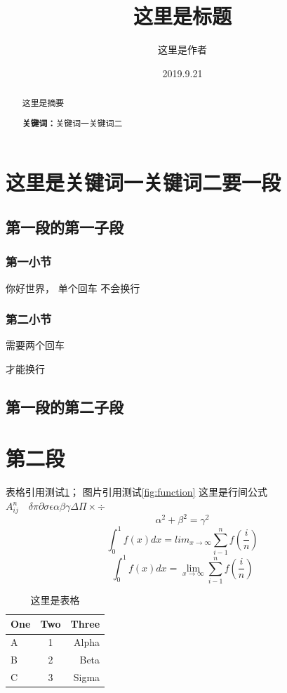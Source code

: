 \documentclass[UTF8]{ctexart}
\title{这里是标题}
\author{这里是作者}
\date{2019.9.21}
\begin{document}
\maketitle
\begin{abstract} 
这里是摘要

\textbf{关键词：}关键词一\quad 关键词二
\end{abstract}
\section{这里是关键词一\quad 关键词二要一段}
\subsection{第一段的第一子段}
\subsubsection{第一小节}
你好世界\cite{Liu}，
单个回车
不会换行
\subsubsection{第二小节}
需要两个回车


才能换行
\subsection{第一段的第二子段}
\section{第二段}
表格引用测试\cref{tbl:number}；
图片引用测试\cref{fig:function}
这里是行间公式$A_{ij}^n \quad \delta \pi \partial \sigma   \epsilon \alpha  \beta \gamma \Delta \Pi \times \div$
\begin{equation}
\alpha^2 + \beta^2 = \gamma^2
\end{equation}
\[ \int_0^1f(x)dx=lim_{x \to \infty}\sum_{i-1}^nf(\frac{i}{n}) \]
\[ \int_0^1f(x)dx=\lim\limits_{x \to \infty}\sum\limits_{i-1}^nf(\frac{i}{n}) \]   

\begin{table}
\caption{这里是表格}
\label{tbl:number}
\begin{center}
\begin{tabular}{lcr}
\toprule
One & Two & Three \\
\midrule
A & 1 & Alpha \\
B & 2 & Beta \\
C & 3 & Sigma \\
\bottomrule
\end{tabular}
\end{center}
\end{table}
\end{document}
